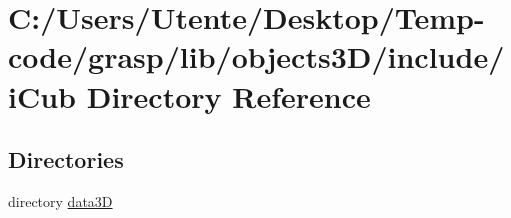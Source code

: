 \section{C\+:/\+Users/\+Utente/\+Desktop/\+Temp-\/code/grasp/lib/objects3\+D/include/i\+Cub Directory Reference}
\label{dir_69b4abfc6cbb1560b0cc12f65f792213}
\subsection*{Directories}
\begin{DoxyCompactItemize}
\item 
directory \hyperlink{dir_b078b37f4859b4fdba58d30fdeed57d2}{data3\+D}
\end{DoxyCompactItemize}
